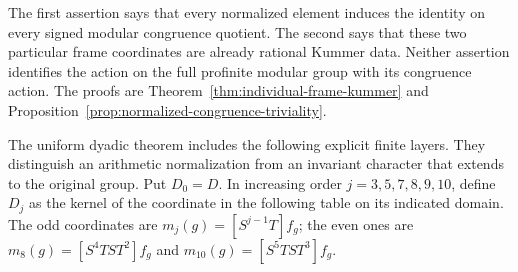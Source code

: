 \documentclass[11pt,a4paper]{article}
\theoremstyle{definition}
\theoremstyle{remark}
\begin{document}
The first assertion says that every normalized element induces the
identity on every signed modular congruence quotient. The second says
that these two particular frame coordinates are already rational
Kummer data. Neither assertion identifies the action on the full
profinite modular group with its congruence action. The proofs are
Theorem~\ref{thm:individual-frame-kummer} and
Proposition~\ref{prop:normalized-congruence-triviality}.

The uniform dyadic theorem includes the following explicit finite layers.
They distinguish an arithmetic normalization from an invariant character
that extends to the original group. Put \(D_0=D\). In increasing order
\(j=3,5,7,8,9,10\), define \(D_j\) as the kernel of the coordinate
in the following table on its indicated domain. The odd coordinates are
\(m_j(g)=[S^{j-1}T]f_g\); the even ones are
\(m_8(g)=[S^4TST^2]f_g\) and \(m_{10}(g)=[S^5TST^3]f_g\).
\end{document}
